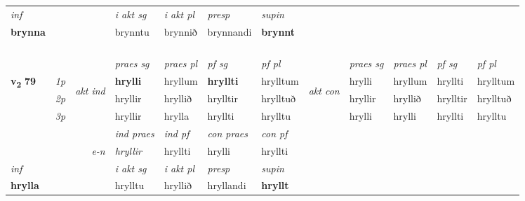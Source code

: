 \begin{longtable}[l]{X>{\footnotesize\itshape}llXXXXlXXXX}
   {\textit{inf}} & &  & \textit{i akt sg} & \textit{i akt pl}   & \textit{presp} & \textit{supin}   \\*
  {\textbf{brynna}} & && brynntu  & brynnið   & brynnandi &  \textbf{brynnt}   \\*

\midrule
 & \\*
  & \\*
   & \\*
  & \\
   \midrule
 & &   & \textit{praes sg}  & \textit{praes pl}    & \textit{ pf sg} & \textit{pf pl} & & \textit{praes sg}  & \textit{praes pl}    & \textit{pf sg} & \textit{pf pl }  \\ \cmidrule{4-7} \cmidrule{9-12}
 \multirow{2}{*}{{{\textbf{v{\textsubscript{2}}} \Large{\textbf{79}}}}}  & 1p & \multirow{3}{*}{\begin{turn}{90}\textit{akt ind}\end{turn}} & \textbf{hrylli} & hryllum & \textbf{hryllti} & hrylltum & \multirow{3}{*}{\begin{turn}{90}\textit{akt con}\end{turn}} &hrylli & hryllum & hryllti & hrylltum\\*
 & 2p &  &  hryllir  & hryllið & hrylltir & hrylltuð & & hryllir & hryllið & hrylltir & hrylltuð \\*
 & 3p &  & hryllir & hrylla & hryllti & hrylltu & & hrylli & hrylli& hryllti & hrylltu \\*
\cmidrule{4-7} \cmidrule{9-12}

   && &  \textit{ind praes} & \textit{ind pf} & \textit{con praes} & \textit{con pf} \\*
\multicolumn{3}{r}{\textit{e-n}} & hryllir & hryllti & hrylli & hryllti \\*

\cmidrule{4-7}
   {\textit{inf}} & &  & \textit{i akt sg} & \textit{i akt pl}   & \textit{presp} & \textit{supin}   \\*
  {\textbf{hrylla}} & && hrylltu  & hryllið   & hryllandi &  \textbf{hryllt}   \\*

\midrule


\end{longtable}
